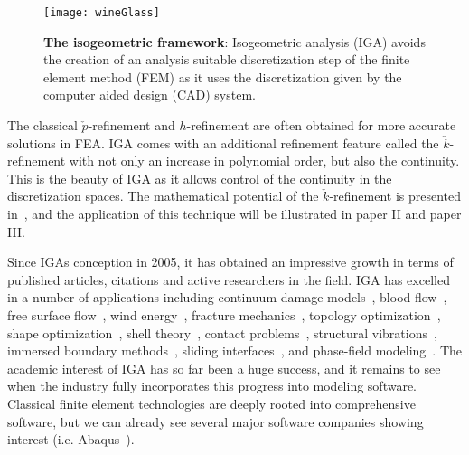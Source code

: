 \begin{figure}
	\centering    
	\texttt{[image: wineGlass]}
	\caption{\textbf{The isogeometric framework}: Isogeometric analysis (IGA) avoids the creation of an analysis suitable discretization step of the finite element method (FEM) as it uses the discretization given by the computer aided design (CAD) system.}
	\label{Fig:wineGlass}
\end{figure}

The classical $\check{p}$-refinement and $h$-refinement are often obtained for more accurate solutions in FEA. IGA comes with an additional refinement feature called the $\check{k}$-refinement with not only an increase in polynomial order, but also the continuity. This is the beauty of IGA as it allows control of the continuity in the discretization spaces. The mathematical potential of the $\check{k}$-refinement is presented in~\cite{BeiraodaVeiga2011sef}, and the application of this technique will be illustrated in paper II and paper III.

Since IGAs conception in 2005, it has obtained an impressive growth in terms of published articles, citations and active researchers in the field. IGA has excelled in a number of applications including continuum damage models~\cite{Verhoosel2011aia}, blood flow~\cite{Bazilevs2006ifi,Zhang2007psv,Morganti2015psi}, free surface flow~\cite{Akkerman2011iao}, wind energy~\cite{Hsu2011hpc,Bazilevs2012ifi}, fracture mechanics~\cite{Borden2012apf,Borden2014aho,Moutsanidis2018hpf}, topology optimization~\cite{Dede2012iaf}, shape optimization~\cite{Manh2011iso,Kiendl2014iso}, shell theory~\cite{Benson2010isa}, contact problems~\cite{Dittmann2014iaa,Temizer2011cti}, structural vibrations~\cite{Cottrell2006iao}, immersed boundary methods~\cite{Schillinger2012aid}, sliding interfaces~\cite{Bazilevs2008nbi}, and phase-field modeling~\cite{Gomez2008iao}. The academic interest of IGA has so far been a huge success, and it remains to see when the industry fully incorporates this progress into modeling software. Classical finite element technologies are deeply rooted into comprehensive software, but we can already see several major software companies showing interest (i.e. Abaqus~\cite{Lai2017icw}).	


